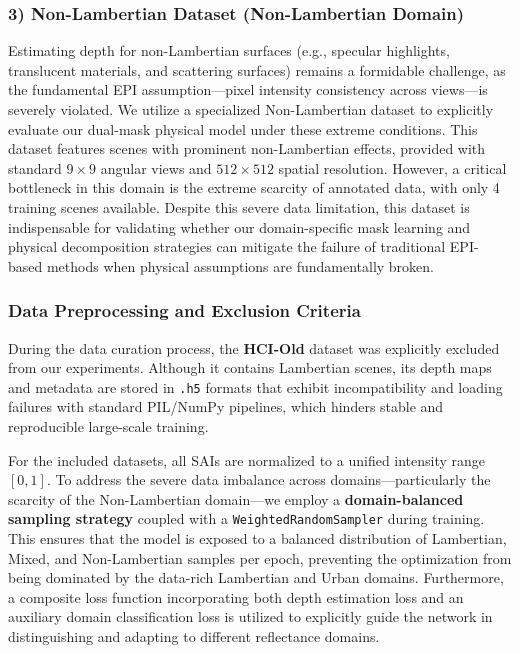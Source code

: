 \documentclass[lettersize,journal]{IEEEtran}
\begin{document}
\subsubsection{3) Non-Lambertian Dataset (Non-Lambertian Domain)}
Estimating depth for non-Lambertian surfaces (e.g., specular highlights, translucent materials, and scattering surfaces) remains a formidable challenge, as the fundamental EPI assumption---pixel intensity consistency across views---is severely violated. We utilize a specialized Non-Lambertian dataset to explicitly evaluate our dual-mask physical model under these extreme conditions. This dataset features scenes with prominent non-Lambertian effects, provided with standard $9 \times 9$ angular views and $512 \times 512$ spatial resolution. However, a critical bottleneck in this domain is the extreme scarcity of annotated data, with only 4 training scenes available. Despite this severe data limitation, this dataset is indispensable for validating whether our domain-specific mask learning and physical decomposition strategies can mitigate the failure of traditional EPI-based methods when physical assumptions are fundamentally broken.

\subsubsection{Data Preprocessing and Exclusion Criteria}
During the data curation process, the \textbf{HCI-Old} dataset was explicitly excluded from our experiments. Although it contains Lambertian scenes, its depth maps and metadata are stored in \texttt{.h5} formats that exhibit incompatibility and loading failures with standard PIL/NumPy pipelines, which hinders stable and reproducible large-scale training. 

For the included datasets, all SAIs are normalized to a unified intensity range $[0, 1]$. To address the severe data imbalance across domains---particularly the scarcity of the Non-Lambertian domain---we employ a \textbf{domain-balanced sampling strategy} coupled with a \texttt{WeightedRandomSampler} during training. This ensures that the model is exposed to a balanced distribution of Lambertian, Mixed, and Non-Lambertian samples per epoch, preventing the optimization from being dominated by the data-rich Lambertian and Urban domains. Furthermore, a composite loss function incorporating both depth estimation loss and an auxiliary domain classification loss is utilized to explicitly guide the network in distinguishing and adapting to different reflectance domains.
\end{document}
